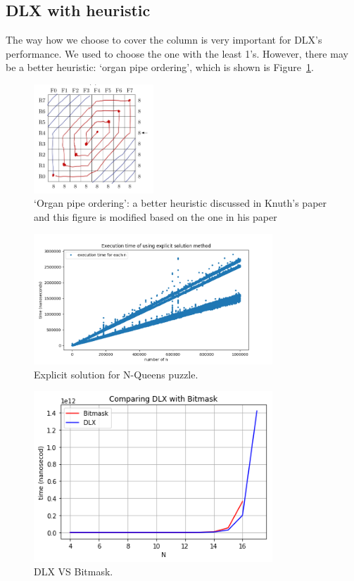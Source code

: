 \subsection{DLX with heuristic}
The way how we choose to cover the column is very important for DLX's performance. We used to choose the one with the least 1's.  However, there may be a better heuristic: `organ pipe ordering', which is shown is Figure~\ref{fig:organPipe}.
\begin{figure}[ht]
  \centering
  \includegraphics[width=0.4\textwidth]{figure/organPipe.jpg}
  \caption{`Organ pipe ordering': a better heuristic discussed in Knuth's paper and this figure is modified based on the one in his paper}
  \label{fig:organPipe}
\end{figure}

\begin{figure}[ht]
  \centering
  \includegraphics[width=0.8\textwidth]{figure/explicit_solution.png}
  \caption{Explicit solution for N-Queens puzzle.}
  \label{fig:one_solution}
\end{figure}

\begin{figure}[ht]
  \centering
  \includegraphics[width=0.8\textwidth]{figure/csp_dlx.png}
  \caption{DLX VS Bitmask.}
  \label{fig:dlxVSBitmask}
\end{figure}
